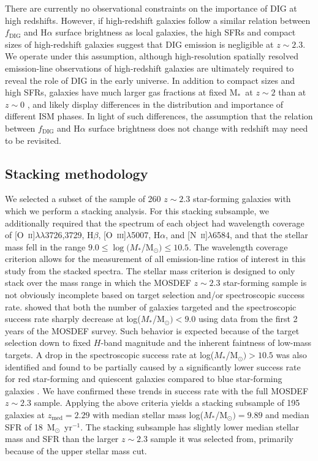 \documentclass[iop,twocolappendix]{emulateapj}
\newcommand{\mstar}{$\mbox{M}_*$}
\newcommand{\ii}{~\textsc{ii}}
\newcommand{\iii}{~\textsc{iii}}
\begin{document}
There are currently no observational constraints on the importance of DIG at high redshifts.
  However, if high-redshift galaxies follow a similar relation between $f_{\text{DIG}}$
 and H$\alpha$ surface brightness as local galaxies, the high SFRs and compact sizes of
 high-redshift galaxies suggest that DIG emission is negligible at $z\sim2.3$.
  We operate under this assumption, although high-resolution spatially resolved
 emission-line observations of high-redshift galaxies are ultimately required to
 reveal the role of DIG in the early universe.  In addition to compact sizes and high SFRs,
 galaxies have much larger gas fractions at fixed \mstar\ at
 $z\sim2$ than at $z\sim0$ \citep{tac13}, and likely display
 differences in the distribution and importance of different ISM phases.  In light of such
 differences, the assumption that the relation between $f_{\text{DIG}}$ and H$\alpha$
 surface brightness does not change with redshift may need to be revisited.

\subsection{Stacking methodology}

We selected a subset of the sample of 260 $z\sim2.3$ star-forming galaxies with which we perform
 a stacking analysis.  For this stacking subsample, we additionally required that the spectrum
 of each object had wavelength coverage of [O\ii]$\lambda\lambda$3726,3729, H$\beta$,
 [O\iii]$\lambda$5007, H$\alpha$, and [N\ii]$\lambda$6584, and that the stellar mass
 fell in the range $9.0\leq\log(M_*$/M$_{\odot})\leq10.5$.  The wavelength coverage criterion
 allows for the measurement of all emission-line ratios of interest in this study from the
 stacked spectra.  The stellar mass criterion is designed to only stack over the mass range
 in which the MOSDEF $z\sim2.3$ star-forming sample is not obviously incomplete based on target selection
 and/or spectroscopic success rate.  \citet{kri15} showed that both the number of galaxies
 targeted and the spectroscopic success rate sharply decrease at log($M_*$/M$_{\odot})<9.0$
 using data from the first 2 years of the MOSDEF survey.  Such behavior is expected because
 of the target selection down to fixed $H$-band magnitude and the inherent faintness of low-mass
 targets.  A drop in the spectroscopic success rate at log($M_*$/M$_{\odot})>10.5$ was also
 identified and found to be partially caused by a significantly lower success rate for red
 star-forming and quiescent galaxies compared to blue star-forming galaxies \citep{kri15}.
  We have confirmed these trends in success rate with the full MOSDEF $z\sim2.3$ sample.
  Applying the above criteria yields
 a stacking subsample of 195 galaxies at $z_{\text{med}}=2.29$ with median stellar mass
 log($M_*$/M$_{\odot})=9.89$ and median SFR of 18~M$_{\odot}$~yr$^{-1}$.
  The stacking subsample has slightly lower median stellar mass and SFR than the larger $z\sim2.3$
 sample it was selected from, primarily because of the upper stellar mass cut.
\end{document}
